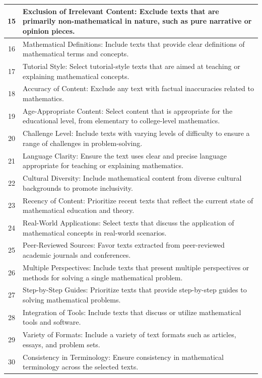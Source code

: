 \documentclass{article}
\begin{document}
\begin{longtable}{c|p{14cm}}
\hline
15 & Exclusion of Irrelevant Content: Exclude texts that are primarily non-mathematical in nature, such as pure narrative or opinion pieces. \\
\hline
16 & Mathematical Definitions: Include texts that provide clear definitions of mathematical terms and concepts. \\
\hline
17 & Tutorial Style: Select tutorial-style texts that are aimed at teaching or explaining mathematical concepts. \\
\hline
18 & Accuracy of Content: Exclude any text with factual inaccuracies related to mathematics. \\
\hline
19 & Age-Appropriate Content: Select content that is appropriate for the educational level, from elementary to college-level mathematics. \\
\hline
20 & Challenge Level: Include texts with varying levels of difficulty to ensure a range of challenges in problem-solving. \\
\hline
21 & Language Clarity: Ensure the text uses clear and precise language appropriate for teaching or explaining mathematics. \\
\hline
22 & Cultural Diversity: Include mathematical content from diverse cultural backgrounds to promote inclusivity. \\
\hline
23 & Recency of Content: Prioritize recent texts that reflect the current state of mathematical education and theory. \\
\hline
24 & Real-World Applications: Select texts that discuss the application of mathematical concepts in real-world scenarios. \\
\hline
25 & Peer-Reviewed Sources: Favor texts extracted from peer-reviewed academic journals and conferences. \\
\hline
26 & Multiple Perspectives: Include texts that present multiple perspectives or methods for solving a single mathematical problem. \\
\hline
27 & Step-by-Step Guides: Prioritize texts that provide step-by-step guides to solving mathematical problems. \\
\hline
28 & Integration of Tools: Include texts that discuss or utilize mathematical tools and software. \\
\hline
29 & Variety of Formats: Include a variety of text formats such as articles, essays, and problem sets. \\
\hline
30 & Consistency in Terminology: Ensure consistency in mathematical terminology across the selected texts. \\

\end{longtable}
\end{document}
